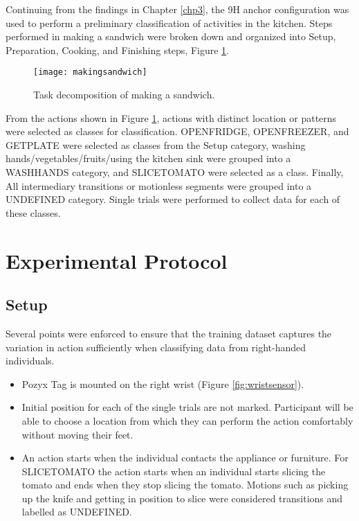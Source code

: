 Continuing from the findings in Chapter \ref{chp3}, the 9H anchor configuration
was used to perform a preliminary classification of activities in the 
kitchen. Steps performed in making a sandwich were broken down and organized
into Setup, Preparation, Cooking, and Finishing steps, Figure \ref{fig:sandwichbreakdown}. 

\begin{figure}[ht]
    \centering
    \texttt{[image: makingsandwich]}
    \caption{Task decomposition of making a sandwich.}
    \label{fig:sandwichbreakdown}
\end{figure}

From the actions shown in Figure \ref{fig:sandwichbreakdown}, actions 
with distinct location or patterns were selected as classes for classification.
OPENFRIDGE, OPENFREEZER, and GETPLATE were selected as classes from the Setup
category, washing hands/vegetables/fruits/using the kitchen sink were grouped 
into a WASHHANDS category, and SLICETOMATO were selected as a class. Finally,
All intermediary transitions or motionless segments were grouped into a 
UNDEFINED category. Single trials were performed to collect data for each of 
these classes. 

\clearpage
\section{Experimental Protocol}
\subsection{Setup}
Several points were enforced to ensure that the training dataset captures
the variation in action sufficiently when classifying data from right-handed individuals.

\begin{itemize}
    \item Pozyx Tag is mounted on the right wrist (Figure \ref{fig:wristsensor}).
    \item Initial position for each of the single trials are not marked. Participant
    will be able to choose a location from which they can perform the action comfortably
    without moving their feet.
    \item An action starts when the individual contacts the appliance or furniture.
    For SLICETOMATO the action starts when an individual starts slicing the 
    tomato and ends when they stop slicing the tomato. Motions such as picking up the
    knife and getting in position to slice were considered transitions and labelled 
    as UNDEFINED. 
\end{itemize}


